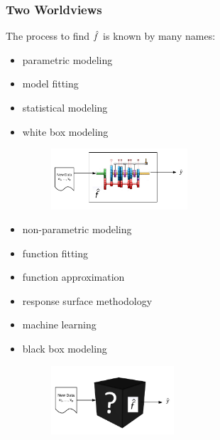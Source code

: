 \documentclass[slides]{beamer} %
\begin{document}
\begin{frame}\frametitle{Two Worldviews}


The process to find $\hat{f}$ is known by many names:

\begin{minipage}{0.5\textwidth}
\begin{itemize}
\item parametric modeling
\item model fitting
\item statistical modeling
\item white box modeling
\begin{figure}
\hspace{-1cm}\includegraphics[width=2.0in]{whitebox}
\end{figure}
\end{itemize}
\end{minipage}%
\begin{minipage}{0.5\textwidth}
\begin{itemize}
\item non-parametric modeling
\item function fitting
\item function approximation
\item response surface methodology
\item machine learning
\item black box modeling
\begin{figure}
\centering
\hspace{-0.5cm}\includegraphics[width=1.8in]{blackbox}
\end{figure}
\end{itemize}
\end{minipage}

\end{frame}
\end{document}
